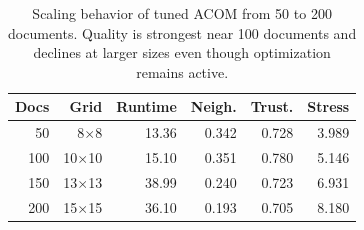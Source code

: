 \begin{table}[!tb]
  \caption{Scaling behavior of tuned ACOM from 50 to 200 documents. Quality is strongest near 100 documents and declines at larger sizes even though optimization remains active.}
  \label{tab:scaling}
  \centering
  \small
  \begin{tabular}{rrrrrr}
    \toprule
    Docs & Grid & Runtime & Neigh. & Trust. & Stress \\
    \midrule
    50 & 8$\times$8 & 13.36 & 0.342 & 0.728 & 3.989 \\
    100 & 10$\times$10 & 15.10 & 0.351 & 0.780 & 5.146 \\
    150 & 13$\times$13 & 38.99 & 0.240 & 0.723 & 6.931 \\
    200 & 15$\times$15 & 36.10 & 0.193 & 0.705 & 8.180 \\
    \bottomrule
  \end{tabular}
\end{table}

